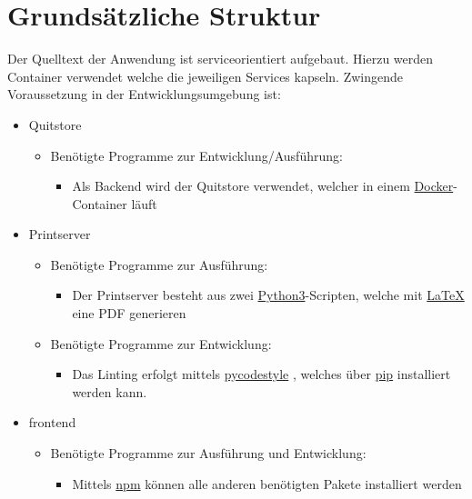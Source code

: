 \documentclass[a4paper,11pt,oneside, titlepage]{article}
\begin{document}
\section{Grundsätzliche Struktur}
Der Quelltext der Anwendung ist serviceorientiert aufgebaut. Hierzu werden Container verwendet welche die jeweiligen Services kapseln. Zwingende Voraussetzung in der Entwicklungsumgebung ist: 
\begin{itemize}
	\item Quitstore
	\begin{itemize}
		\item Benötigte Programme zur Entwicklung/Ausführung:
		\begin{itemize}
			\item Als Backend wird der Quitstore verwendet, welcher in einem \href{https://www.docker.com/get-docker}{Docker}-Container läuft
		\end{itemize}
	\end{itemize}	
	\item Printserver
	\begin{itemize}
		\item Benötigte Programme zur Ausführung:
		\begin{itemize}
			\item Der Printserver besteht aus zwei \href{https://docs.python.org/3/}{Python3}-Scripten, welche mit \href{https://www.latex-project.org/help/documentation/}{\LaTeX} eine PDF generieren
		\end{itemize}
		\item Benötigte Programme zur Entwicklung:
		\begin{itemize}
			\item Das Linting erfolgt mittels \href{https://pypi.python.org/pypi/pycodestyle}{pycodestyle} , welches über \href{https://pypi.python.org/pypi/pip}{pip} installiert werden kann.
		\end{itemize}
	\end{itemize}
	\item frontend
	\begin{itemize}
		\item Benötigte Programme zur Ausführung und Entwicklung:
		\begin{itemize}
			\item Mittels \href{https://docs.npmjs.com/}{npm} können alle anderen benötigten Pakete installiert werden
		\end{itemize}
	\end{itemize}
\end{itemize}
\end{document}
